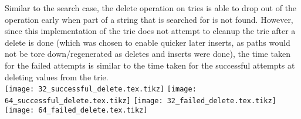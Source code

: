 \documentclass{llncs}
\begin{document}
\newpage
Similar to the search case, the delete operation on tries is able to drop out of the operation early when part of a string that is searched for is not found. However, since this implementation of the trie does not attempt to cleanup the trie after a delete is done (which was chosen to enable quicker later inserts, as paths would not be tore down/regenerated as deletes and inserts were done), the time taken for the failed attempts is similar to the time taken for the successful attempts at deleting values from the trie. \\
\texttt{[image: 32\_successful\_delete.tex.tikz]}
\texttt{[image: 64\_successful\_delete.tex.tikz]}
\texttt{[image: 32\_failed\_delete.tex.tikz]}
\texttt{[image: 64\_failed\_delete.tex.tikz]}

\newpage
\end{document}
